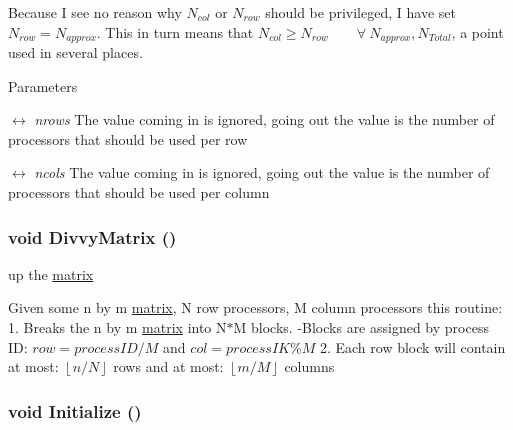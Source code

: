 Because I see no reason why $N_{col}$ or $N_{row}$ should be privileged, I have set $N_{row}=N_{approx}$. This in turn means that $N_{col}\ge N_{row}\qquad\forall\ N_{approx},N_{Total}$, a point used in several places.


\begin{DoxyParams}{Parameters}
\item[\mbox{$\leftrightarrow$} {\em nrows}]The value coming in is ignored, going out the value is the number of processors that should be used per row \item[\mbox{$\leftrightarrow$} {\em ncols}]The value coming in is ignored, going out the value is the number of processors that should be used per column \end{DoxyParams}
\hypertarget{classJKBuilder_1_1DistributedMatrix_a425fa9d0b5ab98afbe7233895795060f}{
\subsubsection[{DivvyMatrix}]{\setlength{\rightskip}{0pt plus 5cm}void DivvyMatrix ()}}
\label{classJKBuilder_1_1DistributedMatrix_a425fa9d0b5ab98afbe7233895795060f}
up the \hyperlink{classJKBuilder_1_1matrix}{matrix}

Given some n by m \hyperlink{classJKBuilder_1_1matrix}{matrix}, N row processors, M column processors this routine: 1. Breaks the n by m \hyperlink{classJKBuilder_1_1matrix}{matrix} into N$\ast$M blocks. -\/Blocks are assigned by process ID: $row=processID/M$ and $col=processIK\% M$ 2. Each row block will contain at most: $\left\lfloor n/N\right\rfloor$ rows and at most: $\left\lfloor m/M\right\rfloor$ columns \hypertarget{classJKBuilder_1_1DistributedMatrix_a98b1050f09da390896f964fb7a892391}{
\subsubsection[{Initialize}]{\setlength{\rightskip}{0pt plus 5cm}void Initialize ()}}
\label{classJKBuilder_1_1DistributedMatrix_a98b1050f09da390896f964fb7a892391}


